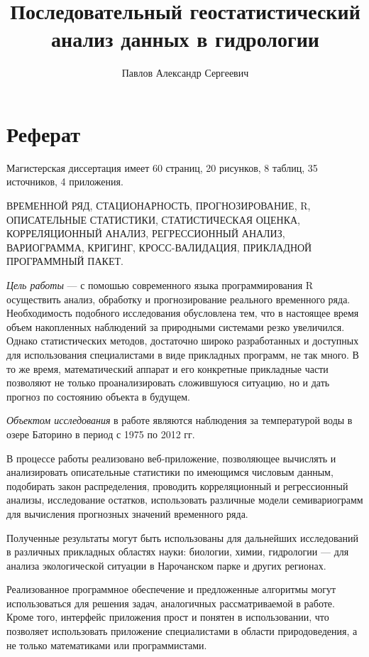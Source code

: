 \documentclass[a4paper,14pt]{extreport}
\title{Последовательный геостатистический анализ данных в гидрологии}
\author{Павлов Александр Сергеевич}
\begin{document}
\maketitle

\newpage

\chapter*{Реферат}
Магистерская диссертация имеет 60 страниц, 20 рисунков, 8 таблиц, 35 источников, 4 приложения.

ВРЕМЕННОЙ РЯД, СТАЦИОНАРНОСТЬ, ПРОГНОЗИРОВАНИЕ, R, ОПИСАТЕЛЬНЫЕ СТАТИСТИКИ, СТАТИСТИЧЕСКАЯ ОЦЕНКА, КОРРЕЛЯЦИОННЫЙ АНАЛИЗ, РЕГРЕССИОННЫЙ АНАЛИЗ, ВАРИОГРАММА, КРИГИНГ, КРОСС-ВАЛИДАЦИЯ, ПРИКЛАДНОЙ ПРОГРАММНЫЙ ПАКЕТ\@.

\textit{Цель работы} --- с помошью современного языка программирования R осуществить анализ, обработку и прогнозирование реального временного ряда. Необходимость подобного исследования обусловлена тем, что в настоящее время объем накопленных наблюдений за природными системами резко увеличился. Однако статистических методов, достаточно широко разработанных и доступных для использования специалистами в виде прикладных программ, не так много. В то же время, математический аппарат и его конкретные прикладные части позволяют не только проанализировать сложившуюся ситуацию, но и дать прогноз по состоянию объекта в будущем.

\textit{Объектом исследования} в работе являются наблюдения за температурой воды в озере Баторино в период с 1975 по 2012 гг.

В процессе работы реализовано веб-приложение, позволяющее вычислять и анализировать описательные статистики по имеющимся числовым данным, подобирать закон распределения, проводить корреляционный и регрессионный анализы, исследование остатков, использовать различные модели семивариограмм для вычисления прогнозных значений временного ряда.

Полученные результаты могут быть использованы для дальнейших исследований в различных прикладных областях науки: биологии, химии, гидрологии --- для анализа экологической ситуации в Нарочанском парке и других регионах.

Реализованное программное обеспечение и предложенные алгоритмы могут использоваться для решения задач, аналогичных рассматриваемой в работе. Кроме того, интерфейс приложения прост и понятен в использовании, что позволяет использовать приложение специалистами в области природоведения, а не только математиками или программистами.
\end{document}

